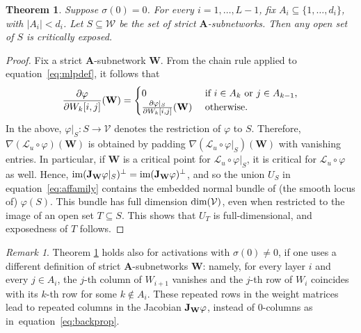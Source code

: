 \documentclass{article} %
\def\eqref#1{equation~\ref{#1}}
\theoremstyle{plain}%
\newtheorem{thm}{Theorem}[section]
\theoremstyle{definition}
\theoremstyle{remark}
\newtheorem{rmk}{Remark}[section]
\newcommand{\jacob}{\textnormal{\textbf{J}}}
\begin{document}
\begin{thm}\label{thm:exposed_new}
Suppose $\sigma(0) = 0$. For every $i=1, \ldots, L-1$, fix $A_i \subseteq \{1, \ldots,  d_i \}$, with $|A_i| < d_i$. Let $S \subseteq \mathcal{W}$ be the set of strict $\mathbf{A}$-subnetworks. Then any open set of $S$ is critically exposed.   
\end{thm}
\begin{proof}
Fix a strict $\mathbf{A}$-subnetwork $\mathbf{W}$. From the chain rule applied to \eqref{eq:mlpdef}, it follows that
\begin{equation}\label{eq:backprop}
   \frac{\partial \varphi }{\partial W_k[i,j]} (\mathbf{W}) = \begin{cases}
        0 & \textnormal{ if }  i \in A_k \textnormal{ or } j \in A_{k-1}, \\
        \frac{\partial \varphi|_S }{\partial W_k[i,j]}(\mathbf{W}) &  \textnormal{ otherwise.}
    \end{cases}
\end{equation}
In the above, $\varphi|_S \colon S \rightarrow \mathcal{V}$ denotes the restriction of $\varphi$ to $S$. Therefore, $\nabla (\mathcal{L}_u \circ \varphi) (\mathbf{W})$ is obtained by padding $\nabla (\mathcal{L}_u \circ \varphi|_S) (\mathbf{W})$ with vanishing entries. In particular, if $\mathbf{W}$ is a critical point for $\mathcal{L}_u \circ \varphi|_S$, it is critical for $\mathcal{L}_u \circ \varphi$ as well. 
Hence, $\textnormal{im}( \jacob_\mathbf{W}\varphi|_S)^\perp=\textnormal{im}( \jacob_\mathbf{W}\varphi)^\perp$, and so the union $U_S$ in \eqref{eq:affamily}
contains the embedded normal bundle of (the smooth locus of) $\varphi(S)$. This bundle has full dimension $\textnormal{dim}(\mathcal{V})$, even when restricted to the image of an open set $T \subseteq S$. This shows that $U_T$ is full-dimensional, and exposedness of $T$ follows.  
\end{proof}

\begin{rmk} \label{rem:exposedSubnetworkRepeated}
    Theorem \ref{thm:exposed_new} holds also for activations with $\sigma(0) \neq 0$, if one uses a different definition of strict $\mathbf{A}$-subnetworks $\mathbf{W}$: namely, for every layer $i$ and every $j \in A_i$, the $j$-th column of $W_{i+1}$ vanishes and the $j$-th row of $W_i$ coincides with its $k$-th row for some $k \notin A_i$. These repeated rows in the weight matrices lead to repeated columns in the Jacobian $\jacob_{\mathbf{W}} \varphi$, instead of 0-columns as in~\eqref{eq:backprop}.
\end{rmk}
\end{document}
